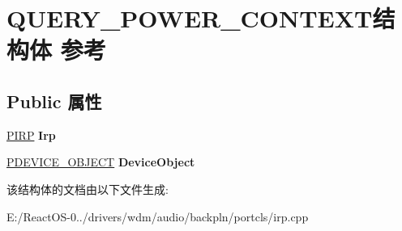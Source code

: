 \hypertarget{struct_q_u_e_r_y___p_o_w_e_r___c_o_n_t_e_x_t}{}\section{Q\+U\+E\+R\+Y\+\_\+\+P\+O\+W\+E\+R\+\_\+\+C\+O\+N\+T\+E\+X\+T结构体 参考}
\label{struct_q_u_e_r_y___p_o_w_e_r___c_o_n_t_e_x_t}
\subsection*{Public 属性}
\begin{DoxyCompactItemize}
\item 
\mbox{\label{struct_q_u_e_r_y___p_o_w_e_r___c_o_n_t_e_x_t_a1ab3c2a00665843acf2a93c06b408798}} 
\hyperlink{interfacevoid}{P\+I\+RP} {\bfseries Irp}
\item 
\mbox{\label{struct_q_u_e_r_y___p_o_w_e_r___c_o_n_t_e_x_t_a7dd8027566c4a3976263e7114c2bef56}} 
\hyperlink{struct___d_e_v_i_c_e___o_b_j_e_c_t}{P\+D\+E\+V\+I\+C\+E\+\_\+\+O\+B\+J\+E\+CT} {\bfseries Device\+Object}
\end{DoxyCompactItemize}


该结构体的文档由以下文件生成\+:\begin{DoxyCompactItemize}
\item 
E\+:/\+React\+O\+S-\/0../drivers/wdm/audio/backpln/portcls/irp.\+cpp\end{DoxyCompactItemize}
